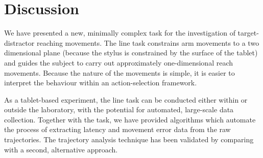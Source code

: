 \documentclass[10pt,letterpaper]{article}
\begin{document}

\section*{Discussion}

We have presented a new, minimally complex task for the investigation
of target-distractor reaching movements.  The line task constrains arm
movements to a two dimensional plane (because the stylus is
constrained by the surface of the tablet) and guides the subject to
carry out approximately one-dimensional reach movements. Because the
nature of the movements is simple, it is easier to interpret the
behaviour within an action-selection framework.

As a tablet-based experiment, the line task can be conducted either
within or outside the laboratory, with the potential for automated,
large-scale data collection.
%
Together with the task, we have provided algorithms
which automate the process of extracting latency
and movement error data from the raw trajectories. The trajectory
analysis technique has been validated by comparing with a second,
alternative approach.


\end{document}
